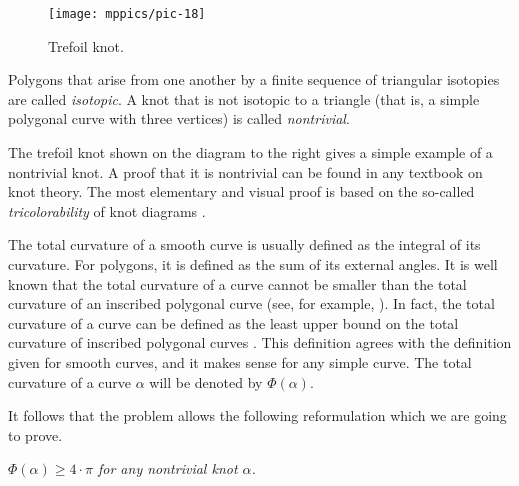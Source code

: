 {

\begin{wrapfigure}{r}{22 mm}
\vskip-0mm
\centering
\texttt{[image: mppics/pic-18]}
\vskip0mm
\caption*{Trefoil knot.}
\end{wrapfigure}

Polygons that arise from one another by a finite sequence of
triangular isotopies are called \emph{isotopic}.
A knot that is not isotopic to a triangle (that is, a simple polygonal curve with three vertices) is called \emph{nontrivial}.

The trefoil knot shown on the diagram to the right gives a simple example of a nontrivial knot.
A proof that it is nontrivial can be found in any textbook on knot theory.
The most elementary and visual proof is based on the so-called \emph{tricolorability} of knot diagrams \cite[Section 1.5]{adams}.

}

The total curvature of a smooth curve is usually defined as the integral of its curvature.
For polygons, it is defined as the sum of its external angles.
It is well known that the total curvature of a curve cannot be smaller than the total curvature of an inscribed polygonal curve (see, for example, \cite{petrunin-zamora}).
In fact, the total curvature of a curve can be defined as the least upper bound on the total curvature of inscribed polygonal curves \cite{aleksandrov-reshetnyak, sullivan-curves}.
This definition agrees with the definition given for smooth curves, and it makes sense for any simple curve.
The total curvature of a curve $\alpha$ will be denoted by $\Phi(\alpha)$.

It follows that the problem allows the following reformulation which we are going to prove.

\textit{$\Phi(\alpha)\ge 4\cdot\pi$ for any nontrivial knot $\alpha$.}


